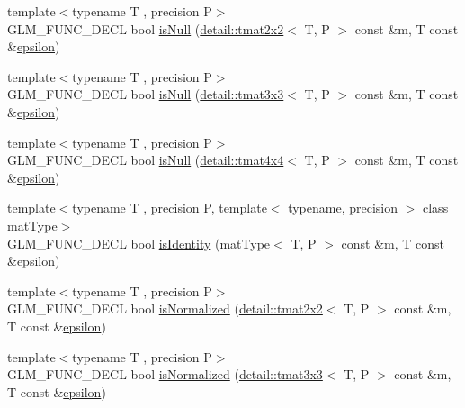 \begin{DoxyCompactItemize}
\item 
{\footnotesize template$<$typename T , precision P$>$ }\\G\+L\+M\+\_\+\+F\+U\+N\+C\+\_\+\+D\+E\+CL bool \hyperlink{group__gtx__matrix__query_gaf7e38680b67a3589a262d281660e4694}{is\+Null} (\hyperlink{structglm_1_1detail_1_1tmat2x2}{detail\+::tmat2x2}$<$ T, P $>$ const \&m, T const \&\hyperlink{group__gtc__constants_gacb41049b8d22c8aa90e362b96c524feb}{epsilon})
\item 
{\footnotesize template$<$typename T , precision P$>$ }\\G\+L\+M\+\_\+\+F\+U\+N\+C\+\_\+\+D\+E\+CL bool \hyperlink{group__gtx__matrix__query_ga7a6ef9f174fec0224214ff5ba6c27ba4}{is\+Null} (\hyperlink{structglm_1_1detail_1_1tmat3x3}{detail\+::tmat3x3}$<$ T, P $>$ const \&m, T const \&\hyperlink{group__gtc__constants_gacb41049b8d22c8aa90e362b96c524feb}{epsilon})
\item 
{\footnotesize template$<$typename T , precision P$>$ }\\G\+L\+M\+\_\+\+F\+U\+N\+C\+\_\+\+D\+E\+CL bool \hyperlink{group__gtx__matrix__query_ga5b8d7b0c7bf1d48ff8df10321440a61a}{is\+Null} (\hyperlink{structglm_1_1detail_1_1tmat4x4}{detail\+::tmat4x4}$<$ T, P $>$ const \&m, T const \&\hyperlink{group__gtc__constants_gacb41049b8d22c8aa90e362b96c524feb}{epsilon})
\item 
{\footnotesize template$<$typename T , precision P, template$<$ typename, precision $>$ class mat\+Type$>$ }\\G\+L\+M\+\_\+\+F\+U\+N\+C\+\_\+\+D\+E\+CL bool \hyperlink{group__gtx__matrix__query_gafc1ce12c738b8c5d007179e615609330}{is\+Identity} (mat\+Type$<$ T, P $>$ const \&m, T const \&\hyperlink{group__gtc__constants_gacb41049b8d22c8aa90e362b96c524feb}{epsilon})
\item 
{\footnotesize template$<$typename T , precision P$>$ }\\G\+L\+M\+\_\+\+F\+U\+N\+C\+\_\+\+D\+E\+CL bool \hyperlink{group__gtx__matrix__query_gaae7339fac94c86ed741f20b6915682ab}{is\+Normalized} (\hyperlink{structglm_1_1detail_1_1tmat2x2}{detail\+::tmat2x2}$<$ T, P $>$ const \&m, T const \&\hyperlink{group__gtc__constants_gacb41049b8d22c8aa90e362b96c524feb}{epsilon})
\item 
{\footnotesize template$<$typename T , precision P$>$ }\\G\+L\+M\+\_\+\+F\+U\+N\+C\+\_\+\+D\+E\+CL bool \hyperlink{group__gtx__matrix__query_gab4c4106cd851951bad5e78a83bfc75dd}{is\+Normalized} (\hyperlink{structglm_1_1detail_1_1tmat3x3}{detail\+::tmat3x3}$<$ T, P $>$ const \&m, T const \&\hyperlink{group__gtc__constants_gacb41049b8d22c8aa90e362b96c524feb}{epsilon})

\end{DoxyCompactItemize}
